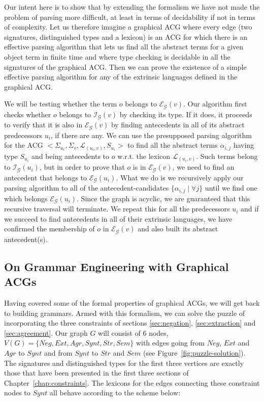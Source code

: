 Our intent here is to show that by extending the formalism we have not
made the problem of parsing more difficult, at least in terms of
decidability if not in terms of complexity. Let us therefore imagine a
graphical ACG where every edge (two signatures, distinguished types and
a lexicon) is an ACG for which there is an effective parsing algorithm
that lets us find all the abstract terms for a given object term in
finite time and where type checking is decidable in all the signatures
of the graphical ACG. Then we can prove the existence of a simple
effective parsing algorithm for any of the extrinsic languages defined
in the graphical ACG.

We will be testing whether the term $o$ belongs to
$\mathcal{E}_{\mathcal{G}}(v)$. Our algorithm first checks whether $o$
belongs to $\mathcal{I}_{\mathcal{G}}(v)$ by checking its type. If it
does, it proceeds to verify that it is also in
$\mathcal{E}_{\mathcal{G}}(v)$ by finding antecedents in all of its
abstract predecessors $u_i$, if there are any. We can use the
presupposed parsing algorithm for the ACG $\mathopen{<} \Sigma_{u_i},
\Sigma_v, \mathcal{L}_{(u_i,v)}, S_{u_i}\mathclose{>}$ to find all the
abstract terms $\alpha_{i,j}$ having type $S_{u_i}$ and being
antecedents to $o$ w.r.t. the lexicon $\mathcal{L}_{(u_i,v)}$. Such
terms belong to $\mathcal{I}_{\mathcal{G}}(u_i)$, but in order to prove
that $o$ is in $\mathcal{E}_{\mathcal{G}}(v)$, we need to find an
antecedent that belongs to $\mathcal{E}_{\mathcal{G}}(u_i)$. What we do
is we recursively apply our parsing algorithm to all of the
antecedent-candidates $\{\alpha_{i,j} \mid \forall j\}$ until we find
one which belongs $\mathcal{E}_{\mathcal{G}}(u_i)$. Since the graph is
acyclic, we are guaranteed that this recursive traversal will
terminate. We repeat this for all the predecessors $u_i$ and if we
succeed to find antecedents in all of their extrinsic languages, we have
confirmed the membership of $o$ in $\mathcal{E}_{\mathcal{G}}(v)$ and
also built its abstract antecedent(s).


\subsection{On Grammar Engineering with Graphical ACGs}
\label{ssec:graphical-engineering}

Having covered some of the formal properties of graphical ACGs, we will
get back to building grammars. Armed with this formalism, we can solve
the puzzle of incorporating the three constraints of sections
\ref{sec:negation}, \ref{sec:extraction} and \ref{sec:agreement}. Our
graph $G$ will consist of 6 nodes, $V(G) = \{Neg, Ext, Agr, Synt, Str,
Sem\}$ with edges going from $Neg$, $Ext$ and $Agr$ to $Synt$ and from
$Synt$ to $Str$ and $Sem$ (see Figure~\ref{fig:puzzle-solution}). The
signatures and distinguished types for the first three vertices are
exactly those that have been presented in the first three sections of
Chapter~\ref{chap:constraints}. The lexicons for the edges connecting
these constraint nodes to $Synt$ all behave according to the scheme
below:

